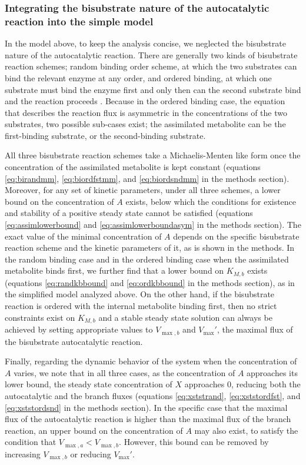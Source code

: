     \subsubsection{Integrating the bisubstrate nature of the autocatalytic reaction into the simple model}
    In the model above, to keep the analysis concise, we neglected the bisubstrate nature of the autocatalytic reaction.
    There are generally two kinds of bisubstrate reaction schemes; random binding order scheme, at which the two substrates can bind the relevant enzyme at any order, and ordered binding, at which one substrate must bind the enzyme first and only then can the second substrate bind and the reaction proceeds \cite{Leskovac2003-li}.
    Because in the ordered binding case, the equation that describes the reaction flux is asymmetric in the concentrations of the two substrates, two possible sub-cases exist; the assimilated metabolite can be the first-binding substrate, or the second-binding substrate.

    All three bisubstrate reaction schemes take a Michaelis-Menten like form once the concentration of the assimilated metabolite is kept constant (equations \ref{eq:birandmm}, \ref{eq:biordfstmm}, and \ref{eq:biordsndmm} in the methods section).
    Moreover, for any set of kinetic parameters, under all three schemes, a lower bound on the concentration of $A$ exists, below which the conditions for existence and stability of a positive steady state cannot be satisfied (equations \ref{eq:assimlowerbound} and \ref{eq:assimlowerboundasym} in the methods section).
    The exact value of the minimal concentration of $A$ depends on the specific bisubstrate reaction scheme and the kinetic parameters of it, as is shown in the methods.
    In the random binding case and in the ordered binding case when the assimilated metabolite binds first, we further find that a lower bound on $K_{M,b}$ exists (equations \ref{eq:randkbbound} and \ref{eq:ordkbbound} in the methods section), as in the simplified model analyzed above.
    On the other hand, if the bisubstrate reaction is ordered with the internal metabolite binding first, then no strict constraints exist on $K_{M,b}$ and a stable steady state solution can always be achieved by setting appropriate values to $V_{\max,b}$ and $V_{\max}'$, the maximal flux of the bisubstrate autocatalytic reaction.
    
    Finally, regarding the dynamic behavior of the system when the concentration of $A$ varies, we note that in all three cases, as the concentration of $A$ approaches its lower bound, the steady state concentration of $X$ approaches $0$, reducing both the autocatalytic and the branch fluxes (equations \ref{eq:xststrand}, \ref{eq:xststordfst}, and \ref{eq:xststordsnd} in the methods section).
    In the specific case that the maximal flux of the autocatalytic reaction is higher than the maximal flux of the branch reaction, an upper bound on the concentration of $A$ may also exist, to satisfy the condition that $V_{\max,a}<V_{\max,b}$.
    However, this bound can be removed by increasing $V_{\max,b}$ or reducing $V_{\max}'$.
